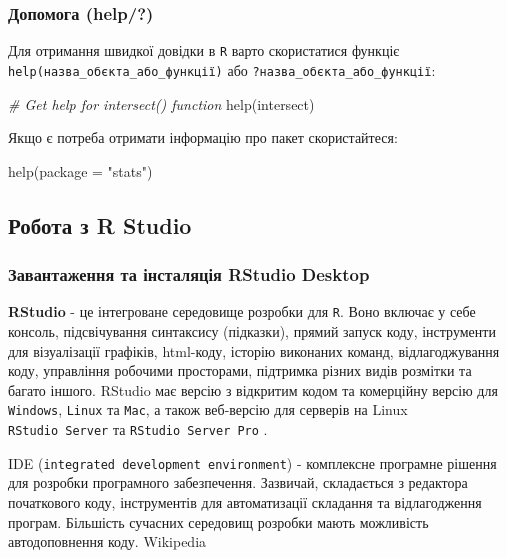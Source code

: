 \documentclass[
]{book}
\newenvironment{Shaded}{\begin{snugshade}}{\end{snugshade}}
\newcommand{\AttributeTok}[1]{\textcolor[rgb]{0.77,0.63,0.00}{#1}}
\newcommand{\CommentTok}[1]{\textcolor[rgb]{0.56,0.35,0.01}{\textit{#1}}}
\newcommand{\FunctionTok}[1]{\textcolor[rgb]{0.00,0.00,0.00}{#1}}
\newcommand{\NormalTok}[1]{#1}
\newcommand{\StringTok}[1]{\textcolor[rgb]{0.31,0.60,0.02}{#1}}
\begin{document}
\hypertarget{chapter1315}{%
\subsubsection{Допомога (help/?)}\label{chapter1315}}

Для отримання швидкої довідки в \texttt{R} варто скористатися функціє \texttt{help(назва\_об\textquotesingle{}єкта\_або\_функції)} або \texttt{?назва\_об\textquotesingle{}єкта\_або\_функції}:

\begin{Shaded}
\begin{Highlighting}[]
\CommentTok{\# Get help for intersect() function}
\FunctionTok{help}\NormalTok{(intersect)}
\end{Highlighting}
\end{Shaded}

Якщо є потреба отримати інформацію про пакет скористайтеся:

\begin{Shaded}
\begin{Highlighting}[]
\FunctionTok{help}\NormalTok{(}\AttributeTok{package =} \StringTok{"stats"}\NormalTok{)}
\end{Highlighting}
\end{Shaded}

\hypertarget{chapter132}{%
\subsection{Робота з R Studio}\label{chapter132}}

\hypertarget{chapter1321}{%
\subsubsection{Завантаження та інсталяція RStudio Desktop}\label{chapter1321}}

\textbf{RStudio} - це інтегроване середовище розробки для \texttt{R}. Воно включає у себе консоль, підсвічування синтаксису (підказки), прямий запуск коду, інструменти для візуалізації графіків, html-коду, історію виконаних команд, відлагоджування коду, управління робочими просторами, підтримка різних видів розмітки та багато іншого. RStudio має версію з відкритим кодом та комерційну версію для \texttt{Windows}, \texttt{Linux} та \texttt{Mac}, а також веб-версію для серверів на Linux \texttt{RStudio\ Server} та \texttt{RStudio\ Server\ Pro} \citep{R-studio-site}.

IDE (\texttt{integrated\ development\ environment}) - комплексне програмне рішення для розробки програмного забезпечення. Зазвичай, складається з редактора початкового коду, інструментів для автоматизації складання та відлагодження програм. Більшість сучасних середовищ розробки мають можливість автодоповнення коду. Wikipedia
\end{document}
